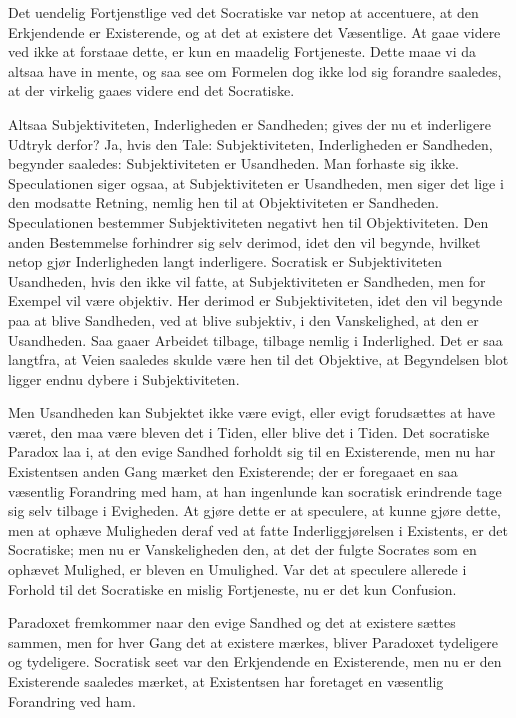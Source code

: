 \documentclass[12pt,a4paper]{article}
\begin{document}
Det uendelig Fortjenstlige ved det Socratiske var netop at accentuere, at den Erkjendende er Existerende, og at det at existere det Væsentlige. At gaae videre ved ikke at forstaae dette, er kun en maadelig Fortjeneste. Dette maae vi da altsaa have in mente, og saa see om Formelen dog ikke lod sig forandre saaledes, at der virkelig gaaes videre end det Socratiske.

Altsaa Subjektiviteten, Inderligheden er Sandheden; gives der nu et inderligere Udtryk derfor? Ja, hvis den Tale: Subjektiviteten, Inderligheden er Sandheden, begynder saaledes: Subjektiviteten er Usandheden. Man forhaste sig ikke. Speculationen siger ogsaa, at Subjektiviteten er Usandheden, men siger det lige i den modsatte Retning, nemlig hen til at Objektiviteten er Sandheden. Speculationen bestemmer Subjektiviteten negativt hen til Objektiviteten. Den anden Bestemmelse forhindrer sig selv derimod, idet den vil begynde, hvilket netop gjør Inderligheden langt inderligere. Socratisk er Subjektiviteten Usandheden, hvis den ikke vil fatte, at Subjektiviteten er Sandheden, men for Exempel vil være objektiv. Her derimod er Subjektiviteten, idet den vil begynde paa at blive Sandheden, ved at blive subjektiv, i den Vanskelighed, at den er Usandheden. Saa gaaer Arbeidet tilbage, tilbage nemlig i Inderlighed. Det er saa langtfra, at Veien saaledes skulde være hen til det Objektive, at Begyndelsen blot ligger endnu dybere i Subjektiviteten.

Men Usandheden kan Subjektet ikke være evigt, eller evigt forudsættes at have været, den maa være bleven det i Tiden, eller blive det i Tiden. Det socratiske Paradox laa i, at den evige Sandhed forholdt sig til en Existerende, men nu har Existentsen anden Gang mærket den Existerende; der er foregaaet en saa væsentlig Forandring med ham, at han ingenlunde kan socratisk erindrende tage sig selv tilbage i Evigheden. At gjøre dette er at speculere, at kunne gjøre dette, men at ophæve Muligheden deraf ved at fatte Inderliggjørelsen i Existents, er det Socratiske; men nu er Vanskeligheden den, at det der fulgte Socrates som en ophævet Mulighed, er bleven en Umulighed. Var det at speculere allerede i Forhold til det Socratiske en mislig Fortjeneste, nu er det kun Confusion.

Paradoxet fremkommer naar den evige Sandhed og det at existere sættes sammen, men for hver Gang det at existere mærkes, bliver Paradoxet tydeligere og tydeligere. Socratisk seet var den Erkjendende en Existerende, men nu er den Existerende saaledes mærket, at Existentsen har foretaget en væsentlig Forandring ved ham.
\end{document}
